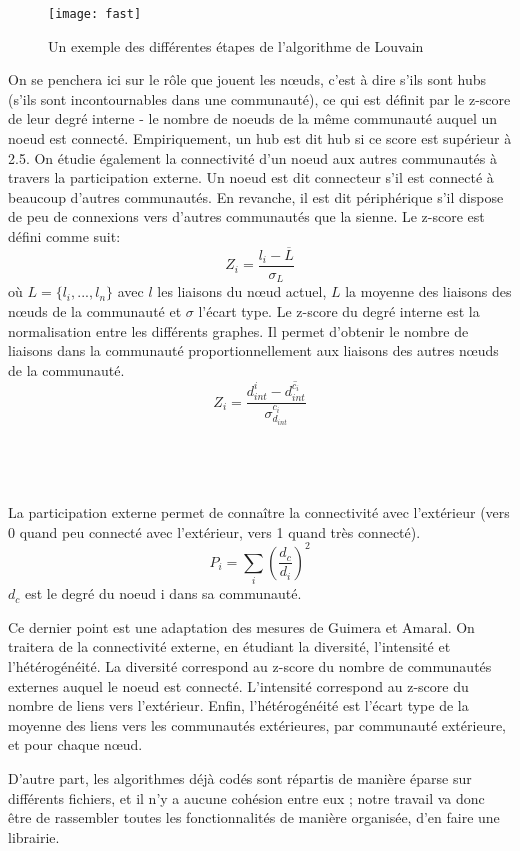 \begin{titlepage}
{\begin{description}
\newpage
\begin{figure}[ht]
\centering
\texttt{[image: fast]}
\caption{Un exemple des différentes étapes de l'algorithme de Louvain}
\end{figure}
\item[Guimera et Amaral :]  On se penchera ici sur le rôle que jouent les nœuds, c'est à dire s'ils sont hubs (s'ils sont incontournables dans une communauté), ce qui est définit par le z-score de leur degré interne - le nombre de noeuds de la m\^eme communauté auquel un noeud est connecté. Empiriquement, un hub est dit hub si ce score est supérieur à 2.5. On étudie également la connectivité d'un noeud aux autres communautés à travers la participation externe. Un noeud est dit connecteur s'il est connecté à  beaucoup d'autres communautés. En revanche, il est dit périphérique s'il dispose de peu de connexions vers d'autres communautés que la sienne. Le z-score est défini comme suit: \[Z_i=\frac{l_i-\overline{L}}{\sigma_L}\] où $L = \{l_i,...,l_n\} $ avec $l$ les liaisons du nœud actuel, $L$ la moyenne des liaisons des nœuds de la communauté et $\sigma$ l'écart type. Le z-score du degré interne est la normalisation entre les différents graphes. Il permet d'obtenir le nombre de liaisons dans la communauté  proportionnellement aux liaisons des autres nœuds de la communauté.\\ \[Z_i=\frac{d_{int}^i - \overline{d_{int}^{c_i}}}{\sigma_{d_{int}}^{c_i}}\] \\ \\ \\ \\La participation externe permet de connaître la connectivité avec l'extérieur (vers 0 quand peu connecté avec l'extérieur, vers 1 quand très connecté). \[P_i=\sum_i\left(\frac{d_c}{d_i}\right)^2\] $d_c$ est le degré du noeud i dans sa communauté.\cite{GA}
\newline
\item[Dugué et Perez  :] Ce dernier point est une adaptation des mesures de Guimera et Amaral. On traitera de la connectivité externe, en étudiant la diversité, l'intensité et l'hétérogénéité. La diversité correspond au z-score du nombre de communautés externes auquel le noeud est connecté. L'intensité correspond au z-score du nombre de liens vers l'extérieur. Enfin, l'hétérogénéité est l'écart type de la moyenne des liens vers les communautés extérieures, par communauté extérieure, et pour chaque nœud. \cite{NDAP1}\cite{NDAP2}  \\ 
\end{description} 
D'autre part, les algorithmes déjà codés sont répartis de manière éparse sur différents fichiers, et il n'y a aucune cohésion entre eux ; notre travail va donc être de rassembler toutes les fonctionnalités de manière organisée, d'en faire une librairie.
}


\end{titlepage}

